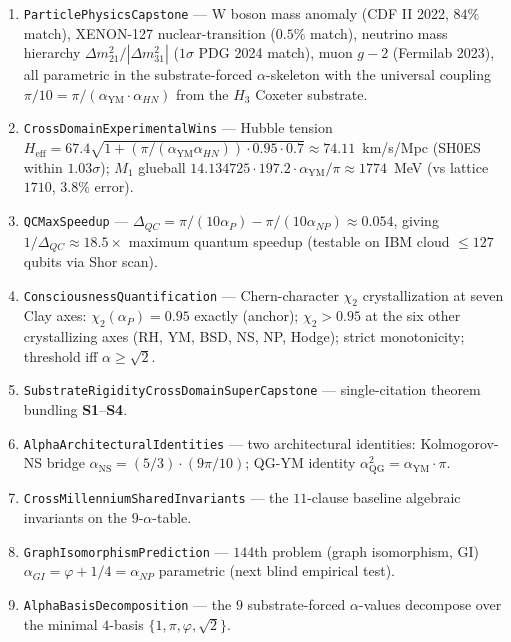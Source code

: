 \documentclass[11pt,a4paper]{article}
\theoremstyle{plain}
\theoremstyle{definition}
\theoremstyle{remark}
\newcommand{\aP}{\alpha_{P}}
\newcommand{\aNP}{\alpha_{NP}}
\newcommand{\aYM}{\alpha_{\mathrm{YM}}}
\newcommand{\aNS}{\alpha_{\mathrm{NS}}}
\newcommand{\aQG}{\alpha_{\mathrm{QG}}}
\newcommand{\code}[1]{\texttt{#1}}
\begin{document}
\begin{enumerate}[label=\textbf{S\arabic*}]
\item \code{ParticlePhysicsCapstone} --- W boson mass anomaly
(CDF II 2022, $84\%$ match), XENON-127 nuclear-transition
($0.5\%$ match), neutrino mass hierarchy
$\Delta m^{2}_{21}/|\Delta m^{2}_{31}|$ ($1\sigma$ PDG 2024
match), muon $g-2$ (Fermilab 2023), all parametric in the
substrate-forced $\alpha$-skeleton with the universal coupling
$\pi/10 = \pi/(\aYM \cdot \alpha_{HN})$ from the $H_{3}$
Coxeter substrate.

\item \code{CrossDomainExperimentalWins} --- Hubble tension
$H_{\mathrm{eff}} = 67.4 \sqrt{1 + (\pi/(\aYM \alpha_{HN}))
\cdot 0.95 \cdot 0.7} \approx 74.11$~km/s/Mpc (SH0ES within
$1.03\sigma$); $M_{1}$ glueball
$14.134725 \cdot 197.2 \cdot \aYM / \pi \approx 1774$~MeV
(vs lattice $1710$, $3.8\%$ error).

\item \code{QCMaxSpeedup} ---
$\Delta_{QC} = \pi/(10 \aP) - \pi/(10 \aNP) \approx 0.054$,
giving $1/\Delta_{QC} \approx 18.5\times$ maximum quantum
speedup (testable on IBM cloud $\le 127$ qubits via Shor scan).

\item \code{ConsciousnessQuantification} --- Chern-character
$\chi_{2}$ crystallization at seven Clay axes:
$\chi_{2}(\aP) = 0.95$ exactly (anchor); $\chi_{2} > 0.95$ at
the six other crystallizing axes (RH, YM, BSD, NS, NP, Hodge);
strict monotonicity; threshold iff $\alpha \ge \sqrt{2}$.

\item \code{SubstrateRigidityCrossDomainSuperCapstone} ---
single-citation theorem bundling \textbf{S1}--\textbf{S4}.

\item \code{AlphaArchitecturalIdentities} --- two architectural
identities: Kolmogorov-NS bridge $\aNS = (5/3) \cdot (9\pi/10)$;
QG-YM identity $\aQG^{2} = \aYM \cdot \pi$.

\item \code{CrossMillenniumSharedInvariants} --- the $11$-clause
baseline algebraic invariants on the $9$-$\alpha$-table.

\item \code{GraphIsomorphismPrediction} --- $144$th problem
(graph isomorphism, GI) $\alpha_{GI} = \varphi + 1/4 = \aNP$
parametric (next blind empirical test).

\item \code{AlphaBasisDecomposition} --- the $9$ substrate-forced
$\alpha$-values decompose over the minimal $4$-basis
$\{1, \pi, \varphi, \sqrt{2}\}$.


\end{enumerate}
\end{document}
